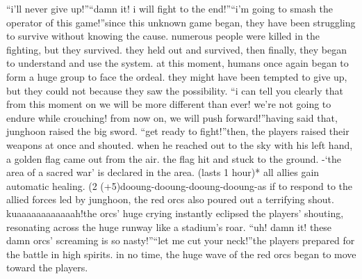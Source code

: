 “i’ll never give up!”“damn it! i will fight to the end!”“i’m going to smash the operator of this game!”since this unknown game began, they have been struggling to survive without knowing the cause.
numerous people were killed in the fighting, but they survived.
 they held out and survived, then finally, they began to understand and use the system.
at this moment, humans once again began to form a huge group to face the ordeal.
they might have been tempted to give up, but they could not because they saw the possibility.
“i can tell you clearly that from this moment on we will be more different than ever! we’re not going to endure while crouching! from now on, we will push forward!”having said that, junghoon raised the big sword.
“get ready to fight!”then, the players raised their weapons at once and shouted.
when he reached out to the sky with his left hand, a golden flag came out from the air.
the flag hit and stuck to the ground.
-‘the area of a sacred war’ is declared in the area.
 (lasts 1 hour)* all allies gain automatic healing.
 (2%
 (+5)dooung-dooung-dooung-dooung-as if to respond to the allied forces led by junghoon, the red orcs also poured out a terrifying shout.
kuaaaaaaaaaaaah!the orcs’ huge crying instantly eclipsed the players’ shouting, resonating across the huge runway like a stadium’s roar.
“uh! damn it! these damn orcs’ screaming is so nasty!”“let me cut your neck!”the players prepared for the battle in high spirits.
 in no time, the huge wave of the red orcs began to move toward the players.

